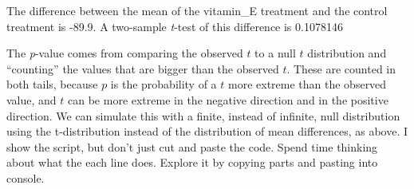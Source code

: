 \documentclass[]{book}
\begin{document}
The difference between the mean of the vitamin\_E treatment and the
control treatment is -89.9. A two-sample \emph{t}-test of this
difference is 0.1078146

The \emph{p}-value comes from comparing the observed \(t\) to a null
\(t\) distribution and ``counting'' the values that are bigger than the
observed \(t\). These are counted in both tails, because \(p\) is the
probability of a \(t\) more extreme than the observed value, and \(t\)
can be more extreme in the negative direction and in the positive
direction. We can simulate this with a finite, instead of infinite, null
distribution using the t-distribution instead of the distribution of
mean differences, as above. I show the script, but don't just cut and
paste the code. Spend time thinking about what the each line does.
Explore it by copying parts and pasting into console.
\end{document}
